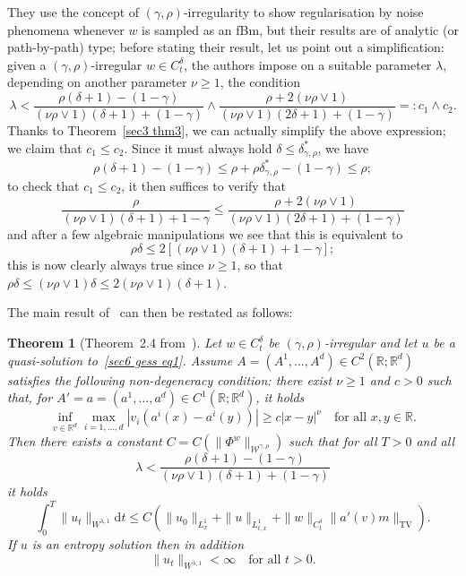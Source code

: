 \documentclass[10pt]{article}
\newcommand{\mathd}{\mathrm{d}}
\newcommand{\tmop}[1]{\ensuremath{\operatorname{#1}}}
\newtheorem{theorem}{Theorem}%
\begin{document}
They use the concept of $(\gamma, \rho)$\mbox{-}irregularity to show
regularisation by noise phenomena whenever $w$ is sampled as an fBm, but their
results are of analytic (or path\mbox{-}by\mbox{-}path) type; before stating
their result, let us point out a simplification: given a $(\gamma,
\rho)$\mbox{-}irregular $w \in C^{\delta}_t$, the authors impose on a suitable
parameter $\lambda$, depending on another parameter $\nu \geqslant 1$, the
condition
\[ \lambda < \frac{\rho (\delta + 1) - (1 - \gamma)}{(\nu \rho \vee 1) (\delta
   + 1) + (1 - \gamma)} \wedge \frac{\rho + 2 (\nu \rho \vee 1)}{(\nu \rho
   \vee 1) (2 \delta + 1) + (1 - \gamma)} =: c_1 \wedge c_2 . \]
Thanks to Theorem~\ref{sec3 thm3}, we can actually simplify the above
expression; we claim that $c_1 \leqslant c_2$. Since it must always hold
$\delta \leqslant \delta^{\ast}_{\gamma, \rho}$, we have
\[ \rho (\delta + 1) - (1 - \gamma) \leqslant \rho + \rho
   \delta^{\ast}_{\gamma, \rho} - (1 - \gamma) \leqslant \rho ; \]
to check that $c_1 \leqslant c_2$, it then suffices to verify that
\[ \frac{\rho}{(\nu \rho \vee 1) (\delta + 1) + 1 - \gamma} \leqslant
   \frac{\rho + 2 (\nu \rho \vee 1)}{(\nu \rho \vee 1) (2 \delta + 1) + (1 -
   \gamma)} \]
and after a few algebraic manipulations we see that this is equivalent to
\[ \rho \delta \leqslant 2 [(\nu \rho \vee 1) (\delta + 1) + 1 - \gamma] ; \]
this is now clearly always true since $\nu \geqslant 1$, so that $\rho \delta
\leqslant (\nu \rho \vee 1) \delta \leqslant 2 (\nu \rho \vee 1) (\delta +
1)$.

The main result of~{\cite{choukgess}} can then be restated as follows:

\begin{theorem}[Theorem~2.4 from~{\cite{choukgess}}]
  \label{sec6 thm chouk gess} Let $w \in C^{\delta}_t$ be $(\gamma,
  \rho)$\mbox{-}irregular and let $u$ be a quasi\mbox{-}solution
  to~\eqref{sec6 gess eq1}. Assume $A = (A^1, \ldots, A^d) \in C^2
  (\mathbb{R}; \mathbb{R}^d)$ satisfies the following non\mbox{-}degeneracy
  condition: there exist $\nu \geqslant 1$ and $c > 0$ such that, for $A' = a
  = (a^1, \ldots, a^d) \in C^1 (\mathbb{R}; \mathbb{R}^d)$, it holds
  \[ \inf_{v \in \mathbb{R}^d} \max_{i = 1, \ldots, d}  | v_i (a^i (x) - a^i
     (y)) | \geqslant c | x - y |^{\nu} \quad \text{for all } x, y \in
     \mathbb{R}. \]
  Then there exists a constant $C = C (\| \Phi^w \|_{\mathcal{W}^{\gamma,
  \rho}})$ such that for all $T > 0$ and all
  \[ \lambda < \frac{\rho (\delta + 1) - (1 - \gamma)}{(\nu \rho \vee 1)
     (\delta + 1) + (1 - \gamma)} \]
  it holds
  \begin{equation}
    \int_0^T \| u_t \|_{W^{\lambda, 1}} \mathd t \leqslant C (\| u_0
    \|_{L^1_x} + \| u \|_{L^1_{t, x}} + \| w \|_{C^{\delta}_t}  \| a' (v) m
    \|_{\tmop{TV}}) . \label{sec6 gess eq2}
  \end{equation}
  If $u$ is an entropy solution then in addition
  \[ \| u_t \|_{W^{\lambda, 1}} < \infty \quad \text{for all } t > 0. \]
\end{theorem}
\end{document}
